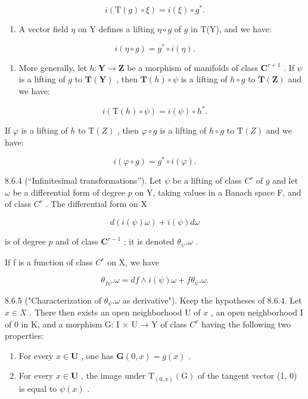 \[
i (\mathrm{T} (g) \circ \xi) = i (\xi) \circ g ^ {*}.\tag{3}
\]

\begin{enumerate}
\def\labelenumi{\alph{enumi})}
\setcounter{enumi}{1}
\tightlist
\item
  A vector field \(\eta\) on Y defines a lifting \(\eta \circ g\) of \(g\) in T(Y), and we have:
\end{enumerate}

\[
i (\eta \circ g) = g ^ {*} \circ i (\eta).\tag{4}
\]

\begin{enumerate}
\def\labelenumi{\alph{enumi})}
\setcounter{enumi}{2}
\tightlist
\item
  More generally, let \(h: \mathbf{Y} \to \mathbf{Z}\) be a morphism of manifolds of class \(\mathbf{C}^{r+1}\) . If \(\psi\) is a lifting of \(g\) to \(\mathbf{T}(\mathbf{Y})\) , then \(\mathbf{T}(h) \circ \psi\) is a lifting of \(h \circ g\) to \(\mathbf{T}(\mathbf{Z})\) and we have:
\end{enumerate}

\[
i (\mathrm{T} (h) \circ \psi) = i (\psi) \circ h ^ {*}.\tag{5}
\]

If \(\varphi\) is a lifting of \(h\) to \(\mathrm{T}(Z)\) , then \(\varphi \circ g\) is a lifting of \(h \circ g\) to \(\mathrm{T}(Z)\) and we have:

\[
i (\varphi \circ g) = g ^ {*} \circ i (\varphi).\tag{6}
\]

8.6.4 (“Infinitesimal transformations”). Let \(\psi\) be a lifting of class \(C^r\) of \(g\) and let \(\omega\) be a differential form of degree \(p\) on Y, taking values in a Banach space F, and of class \(C^r\) . The differential form on X

\[
d (i (\psi) \omega) + i (\psi) d \omega\tag{7}
\]

is of degree \(p\) and of class \(\mathbf{C}^{r-1}\) ; it is denoted \(\theta_{\psi}.\omega\) .

If f is a function of class \(C^{r}\) on X, we have

\[
\theta_ {f \psi}. \omega = d f \wedge i (\psi) \omega + f \theta_ {\psi}. \omega .\tag{8}
\]

8.6.5 ("Characterization of \(\theta_{\psi}.\omega\) as derivative"). Keep the hypotheses of 8.6.4. Let \(x\in X\) . There then exists an open neighborhood U of \(x\) , an open neighborhood I of 0 in K, and a morphism G: I × U → Y of class \(C^{r}\) having the following two properties:

\begin{enumerate}
\def\labelenumi{\alph{enumi})}
\item
  For every \(x \in \mathbf{U}\) , one has \(\mathbf{G}(0, x) = g(x)\) .
\item
  For every \(x \in \mathbf{U}\) , the image under \(\mathrm{T}_{(0,x)}(\mathrm{G})\) of the tangent vector (1, 0) is equal to \(\psi(x)\) .
\end{enumerate}

